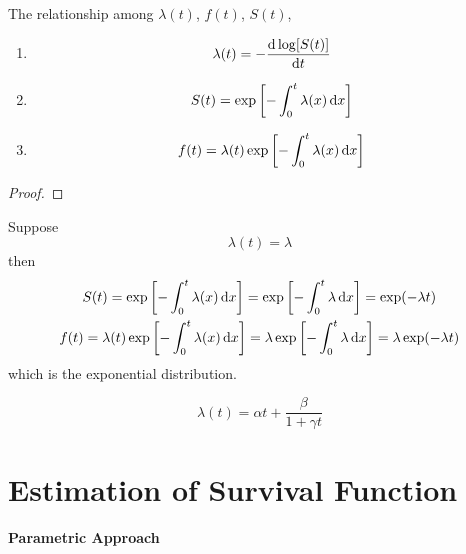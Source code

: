 \begin{property}
	The relationship among $\lambda(t)$, $f(t)$, $S(t)$,
	\begin{enumerate}
		\item
		      \begin{equation}
			      \lambda(t)=-\frac{\mathop{}\!\mathrm{d}\log [S(t)]}{\mathop{}\!\mathrm{d} t}
		      \end{equation}
		\item
		      \begin{equation}
			      S(t)=\exp\left[-\int_{0}^{t}\lambda(x)\mathop{}\!\mathrm{d} x\right]
		      \end{equation}
		\item
		      \begin{equation}
			      f(t)=\lambda(t)\exp\left[-\int_{0}^{t}\lambda(x)\mathop{}\!\mathrm{d} x\right]
		      \end{equation}
	\end{enumerate}
\end{property}

\begin{proof}

\end{proof}

\begin{example}
	Suppose
	\begin{equation}
		\lambda(t)=\lambda
	\end{equation}
	then
	\begin{gather*}
		S(t)=\exp\left[-\int_{0}^{t}\lambda(x)\mathop{}\!\mathrm{d} x\right]=\exp\left[-\int_{0}^{t}\lambda\mathop{}\!\mathrm{d} x\right]=\exp(-\lambda t) \\
		f(t)=\lambda(t)\exp\left[-\int_{0}^{t}\lambda(x)\mathop{}\!\mathrm{d} x\right]=\lambda\exp\left[-\int_{0}^{t}\lambda\mathop{}\!\mathrm{d} x\right]=\lambda\exp(-\lambda t)
	\end{gather*}
	which is the exponential distribution.
\end{example}

\begin{example}
	\begin{equation}
		\lambda(t)=\alpha t+\frac{\beta}{1+\gamma t}
	\end{equation}
\end{example}

\section{Estimation of Survival Function}

\paragraph*{Parametric Approach}

